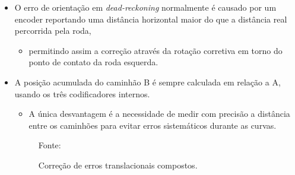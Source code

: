 \documentclass[xcolor=dvipsnames, aspectratio=169]{beamer}
\begin{document}
\begin{frame}
\begin{itemize}
    \item O erro de orientação em \textit{dead-reckoning} normalmente é causado por um encoder reportando uma distância horizontal maior do que a distância real percorrida pela roda,
    \begin{itemize}
      \item permitindo assim a correção através da rotação corretiva em torno do ponto de contato da roda esquerda.
    \end{itemize} 
    \item A posição acumulada do caminhão B é sempre calculada em relação a A, usando os três codificadores internos.
    \begin{itemize}
      \item A única desvantagem é a necessidade de medir com precisão a distância entre os caminhões para evitar erros sistemáticos durante as curvas.
    \end{itemize}
    \newpage
    \begin{figure}
      \centering
      {Fonte: \cite{borenstein1995intemal}}
      \caption{Correção de erros translacionais compostos.}
      \label{fig:2_correcting_composite_translational_errors}
    \end{figure} 
  \end{itemize}
  
\end{frame}
\end{document}
